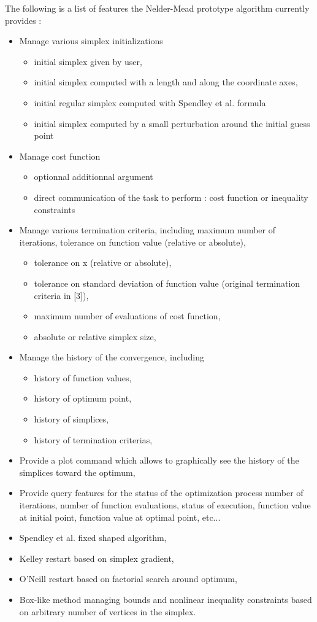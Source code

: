 The following is a list of features the Nelder-Mead prototype algorithm currently provides :
\begin{itemize}
\item Manage various simplex initializations
  \begin{itemize}
  \item initial simplex given by user,
  \item initial simplex computed with a length and along the coordinate axes,
  \item initial regular simplex computed with Spendley et al. formula
  \item initial simplex computed by a small perturbation around the initial guess point
  \end{itemize}
\item Manage cost function
  \begin{itemize}
  \item optionnal additionnal argument
  \item direct communication of the task to perform : cost function or inequality constraints
  \end{itemize}
\item Manage various termination criteria, including maximum number of iterations, tolerance on function value (relative or absolute), 
  \begin{itemize}
  \item tolerance on x (relative or absolute),
  \item tolerance on standard deviation of function value (original termination criteria in [3]),
  \item maximum number of evaluations of cost function,
  \item absolute or relative simplex size,
  \end{itemize}
\item Manage the history of the convergence, including
  \begin{itemize}
  \item history of function values,
  \item history of optimum point,
  \item history of simplices,
  \item history of termination criterias,
  \end{itemize}
\item Provide a plot command which allows to graphically see the history of the simplices toward the optimum,
\item Provide query features for the status of the optimization process number of iterations, number of function evaluations, status of execution, function value at initial point, function value at optimal point, etc...
\item Spendley et al. fixed shaped algorithm,
\item Kelley restart based on simplex gradient,
\item O'Neill restart based on factorial search around optimum,
\item Box-like method managing bounds and nonlinear inequality constraints based on arbitrary number of vertices in the simplex.
\end{itemize}

